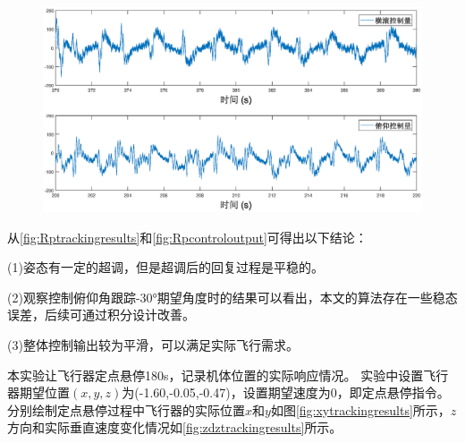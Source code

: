 \documentclass[
  type=master
]{gdutthesis}
\begin{document}
\begin{figure}[H]
	\centering
	\includegraphics[width=1.0\textwidth]{u.eps}
	\label{fig:Rpcontroloutput}
\end{figure}

从\autoref{fig:Rptrackingresults}和\autoref{fig:Rpcontroloutput}可得出以下结论：

(1)姿态有一定的超调，但是超调后的回复过程是平稳的。

(2)观察控制俯仰角跟踪-30°期望角度时的结果可以看出，本文的算法存在一些稳态误差，后续可通过积分设计改善。

(3)整体控制输出较为平滑，可以满足实际飞行需求。

本实验让飞行器定点悬停180s，记录机体位置的实际响应情况。
实验中设置飞行器期望位置$(x,y,z)$为(-1.60,-0.05,-0.47)，设置期望速度为0，即定点悬停指令。
分别绘制定点悬停过程中飞行器的实际位置$x$和$y$如图\autoref{fig:xytrackingresults}所示，$z$方向和实际垂直速度变化情况如\autoref{fig:zdztrackingresults}所示。
%
%
%
\end{document}
